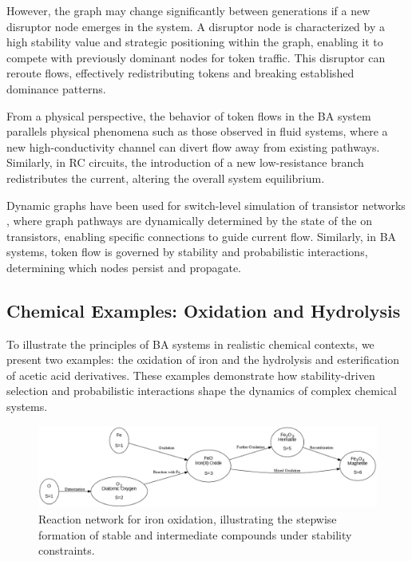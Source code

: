 \documentclass[entropy,article,submit,pdftex,moreauthors]{Definitions/mdpi}
\begin{document}
However, the graph may change significantly between generations if a new disruptor node emerges in the system. A disruptor node is characterized by a high stability value and strategic positioning within the graph, enabling it to compete with previously dominant nodes for token traffic. This disruptor can reroute flows, effectively redistributing tokens and breaking established dominance patterns. 

From a physical perspective, the behavior of token flows in the BA system parallels physical phenomena such as those observed in fluid systems, where a new high-conductivity channel can divert flow away from existing pathways. Similarly, in RC circuits, the introduction of a new low-resistance branch redistributes the current, altering the overall system equilibrium. 

Dynamic graphs have been used for switch-level simulation of transistor networks \cite{AdlerCAD}, where graph pathways are dynamically determined by the state of the on transistors, enabling specific connections to guide current flow. Similarly, in BA systems, token flow is governed by stability and probabilistic interactions, determining which nodes persist and propagate.

\subsection{Chemical Examples: Oxidation and Hydrolysis}

To illustrate the principles of BA systems in realistic chemical contexts, we present two examples: the oxidation of iron and the hydrolysis and esterification of acetic acid derivatives. These examples demonstrate how stability-driven selection and probabilistic interactions shape the dynamics of complex chemical systems.

\begin{figure}[h]
    \centering
    \includegraphics[width=1\textwidth]{abc_oxi.png}
    \caption{Reaction network for iron oxidation, illustrating the stepwise formation of stable and intermediate compounds under stability constraints.}
    \label{fig:abc_oxi}
\end{figure}
\end{document}
